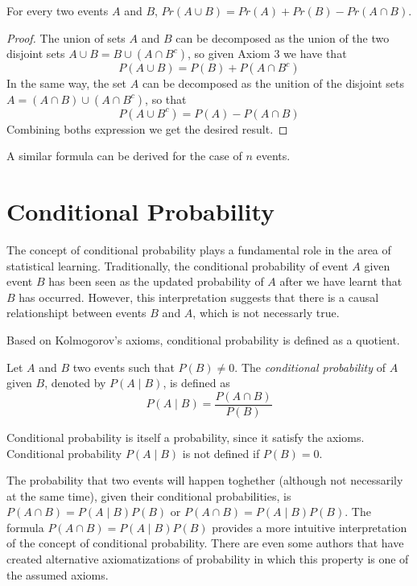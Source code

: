 \begin{proposition}
For every two events $A$ and $B$, $Pr\left(A\cup B\right)=Pr\left(A\right)+Pr\left(B\right)-Pr\left(A\cap B\right)$.
\end{proposition}
\begin{proof}
The union of sets $A$ and $B$ can be decomposed as the union of the two disjoint sets $A \cup B = B \cup \left( A \cap B^c \right)$, so given Axiom 3 we have that
\[
P \left( A \cup B \right) = P \left( B \right) + P \left( A \cap B^c \right)
\]
In the same way, the set $A$ can be decomposed as the unition of the disjoint sets $A = \left( A \cap B \right) \cup \left( A \cap B^c \right)$, so that
\[
P \left( A \cup B^c \right) = P \left( A \right) - P \left( A \cap B \right)
\]
Combining boths expression we get the desired result.
\end{proof}

A similar formula can be derived for the case of $n$ events.

%
%

\section{Conditional Probability}
\label{sec:probability_conditional}

The concept of conditional probability plays a fundamental role in the area of statistical learning. Traditionally, the conditional probability of event $A$ given event $B$ has been seen as the updated probability of $A$ after we have learnt that $B$ has occurred. However, this interpretation suggests that there is a causal relationshipt between events $B$ and $A$, which is not necessarly true.

Based on Kolmogorov's axioms, conditional probability is defined as a quotient.

\begin{definition}
Let $A$ and $B$ two events such that $P \left( B \right) \neq 0$. The \emph{conditional probability} of $A$ given $B$, denoted by $P \left( A \mid B \right)$, is defined as
\[
P\left(A\mid B\right) = \frac{P\left(A\cap B\right)}{P\left(B\right)}
\]
\end{definition}

Conditional probability is itself a probability, since it satisfy the axioms. Conditional probability $P\left(A\mid B\right)$ is not defined if $P\left(B\right)=0$.

The probability that two events will happen toghether (although not necessarily at the same time), given their conditional probabilities, is $P \left( A \cap B \right) = P \left( A \mid B \right) P \left( B \right)$ or $P \left( A \cap B \right) = P \left( A \mid B \right) P \left( B \right)$. The formula $P \left( A \cap B \right) = P \left( A \mid B \right) P \left( B \right)$ provides a more intuitive interpretation of the concept of conditional probability. There are even some authors that have created alternative axiomatizations of probability in which this property is one of the assumed axioms.

